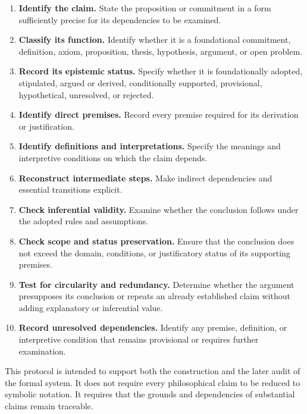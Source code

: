 \begin{enumerate}
    \item \textbf{Identify the claim.}
    State the proposition or commitment in a form sufficiently
    precise for its dependencies to be examined.

    \item \textbf{Classify its function.}
    Identify whether it is a foundational commitment, definition,
    axiom, proposition, thesis, hypothesis, argument, or open
    problem.

    \item \textbf{Record its epistemic status.}
    Specify whether it is foundationally adopted, stipulated,
    argued or derived, conditionally supported, provisional,
    hypothetical, unresolved, or rejected.

    \item \textbf{Identify direct premises.}
    Record every premise required for its derivation or
    justification.

    \item \textbf{Identify definitions and interpretations.}
    Specify the meanings and interpretive conditions on which
    the claim depends.

    \item \textbf{Reconstruct intermediate steps.}
    Make indirect dependencies and essential transitions
    explicit.

    \item \textbf{Check inferential validity.}
    Examine whether the conclusion follows under the adopted
    rules and assumptions.

    \item \textbf{Check scope and status preservation.}
    Ensure that the conclusion does not exceed the domain,
    conditions, or justificatory status of its supporting
    premises.

    \item \textbf{Test for circularity and redundancy.}
    Determine whether the argument presupposes its conclusion
    or repeats an already established claim without adding
    explanatory or inferential value.

    \item \textbf{Record unresolved dependencies.}
    Identify any premise, definition, or interpretive condition
    that remains provisional or requires further examination.
\end{enumerate}

This protocol is intended to support both the construction
and the later audit of the formal system. It does not require
every philosophical claim to be reduced to symbolic notation.
It requires that the grounds and dependencies of substantial
claims remain traceable.

